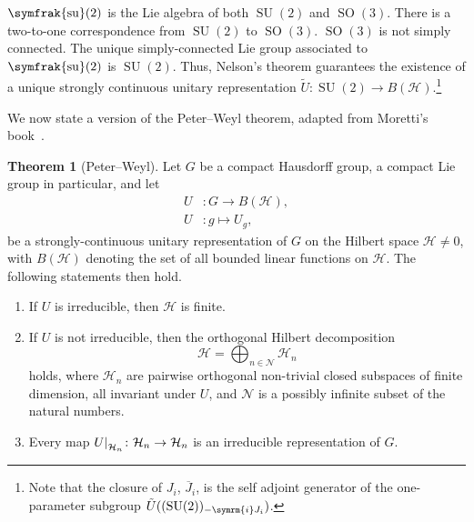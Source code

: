 \documentclass[12pt, a4 paper]{article}
\let\symcal\mathcal
\theoremstyle{definition}
\newtheorem{thm}{Theorem}
\newcommand{\hilbert}{\symcal{H}}
\renewcommand{\i}{\symrm{i}}
\newcommand{\sutwo}{\operatorname{\symfrak{su}}(2)}
\newcommand{\SUtwo}{\operatorname{SU}(2)}
\newcommand{\SOthree}{\operatorname{SO}(3)}
\newcommand\restr[2]{{%
        \left.\kern-\nulldelimiterspace %
        #1 %
        \littletaller %
        \right|_{#2} %
    }}
\newcommand{\littletaller}{\mathchoice{\vphantom{\big|}}{}{}{}}
\begin{document}
    \(\sutwo\) is the Lie algebra of both \(\SUtwo\) and \(\SOthree\). There is a two-to-one correspondence from \(\SUtwo\) to \(\SOthree\). \(\SOthree\) is not simply connected. The unique simply-connected Lie group associated to \(\sutwo\) is \(\SUtwo\). Thus, Nelson's theorem guarantees the existence of a unique strongly continuous unitary representation \(\tilde{U} \colon \SUtwo \rightarrow B(\hilbert)\).\footnote{Note that the closure of \(J_i\), \(\overline{J}_i\), is the self adjoint generator of the one-parameter subgroup \( \tilde{U}( (\SUtwo)_{-\i J_i}) \).}

    We now state a version of the Peter--Weyl theorem, adapted from Moretti's book~\cite[p.~287]{MorettiFundamental}.
    \begin{thm}[Peter--Weyl]
        Let \(G\) be a compact Hausdorff group, a compact Lie group in particular, and let
        \begin{align*}
            U &\colon G \rightarrow B(\hilbert),\\
            U &\colon g \mapsto U_g,
        \end{align*}
        be a strongly-continuous unitary representation of $G$ on the Hilbert space $\hilbert \neq 0$, with $B(\hilbert)$ denoting the set of all bounded linear functions on $\hilbert$. The following statements then hold.
        \begin{enumerate}
            \item If \(U\) is irreducible, then \(\hilbert\) is finite.
            \item If \(U\) is not irreducible, then the orthogonal Hilbert decomposition
            \[
                \hilbert = \bigoplus_{n\in \symcal{N}} \hilbert_n
            \]
            holds, where \(\hilbert_n\) are pairwise orthogonal non-trivial closed subspaces of finite dimension, all invariant under \(U\), and \(\symcal{N}\) is a possibly infinite subset of the natural numbers.
            \item Every map \(\restr{U}{\hilbert_n} \colon \hilbert_n \rightarrow \hilbert_n\) is an irreducible representation of \(G\).
        \end{enumerate}
    \end{thm}
\end{document}
